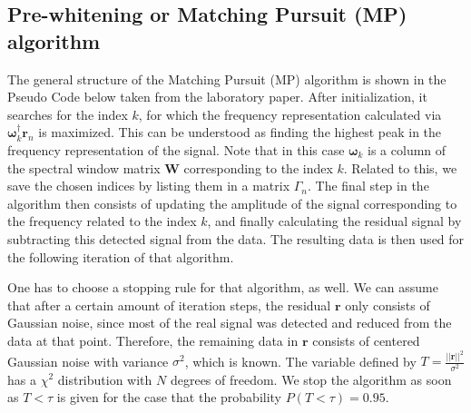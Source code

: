 \subsection{Pre-whitening or Matching Pursuit (MP) algorithm}
The general structure of the  Matching Pursuit (MP) algorithm is shown in the Pseudo Code below taken from the laboratory paper. After initialization, it searches for the index $k$, for which the frequency representation calculated via $\boldsymbol{\omega}_{k}^{\dag}\boldsymbol{r}_{n}$ is maximized. This can be understood as finding the highest peak in the frequency representation of the signal. Note that in this case $\boldsymbol{\omega}_{k}$ is a column of the spectral window matrix $\boldsymbol{W}$ corresponding to the index $k$. Related to this, we save the chosen indices by listing them in a matrix $\Gamma_n$. The final step in the algorithm then consists of updating the amplitude of the signal corresponding to the frequency related to the index $k$, and finally calculating the residual signal by subtracting this detected signal from the data. The resulting data is then used for the following iteration of that algorithm. 

\begin{center}
\end{center}
One has to choose a stopping rule for that algorithm, as well. We can assume that after a certain amount of iteration steps, the residual $\boldsymbol{r}$ only consists of Gaussian noise, since most of the real signal was detected and reduced from the data at that point. Therefore, the remaining data in $\boldsymbol{r}$ consists of centered Gaussian noise with variance $\sigma^{2}$, which is known. The variable defined by $T=\frac{||\boldsymbol{r}||^{2}}{\sigma^{2}}$ has a $\chi^{2}$ distribution with $N$ degrees of freedom. We stop the algorithm as soon as $T<\tau$ is given for the case that the probability $P(T < \tau)=0.95$.

